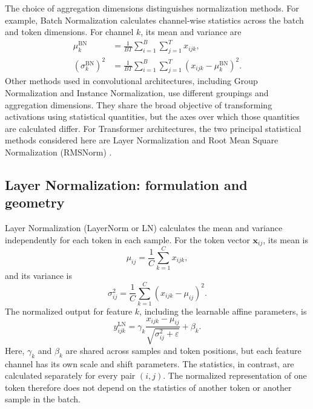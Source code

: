 The choice of aggregation dimensions distinguishes normalization methods.
For example, Batch Normalization calculates channel-wise statistics across
the batch and token dimensions. For channel \(k\), its mean and variance
are
\begin{align}
    \mu_k^{\mathrm{BN}}
    &=
    \frac{1}{BT}
    \sum_{i=1}^{B}\sum_{j=1}^{T}x_{ijk},
    \label{eq:norm-bn-mean}
    \\
    (\sigma_k^{\mathrm{BN}})^2
    &=
    \frac{1}{BT}
    \sum_{i=1}^{B}\sum_{j=1}^{T}
    (x_{ijk}-\mu_k^{\mathrm{BN}})^2.
    \label{eq:norm-bn-variance}
\end{align}
Other methods used in convolutional architectures, including Group
Normalization and Instance Normalization, use different groupings and
aggregation dimensions. They share the broad objective of transforming
activations using statistical quantities, but the axes over which those
quantities are calculated differ. For Transformer architectures, the two
principal statistical methods considered here are Layer Normalization and
Root Mean Square Normalization (RMSNorm)
\parencite{zhu2025dyt,corradini2025slmreview}.

\subsection{Layer Normalization: formulation and geometry}
\label{subsec:norm-layernorm}

Layer Normalization (LayerNorm or LN) calculates the mean and variance
independently for each token in each sample. For the token vector
\(\mathbf{x}_{ij}\), its mean is
\begin{equation}
    \mu_{ij}
    =
    \frac{1}{C}\sum_{k=1}^{C}x_{ijk},
    \label{eq:norm-ln-mean}
\end{equation}
and its variance is
\begin{equation}
    \sigma_{ij}^{2}
    =
    \frac{1}{C}\sum_{k=1}^{C}
    (x_{ijk}-\mu_{ij})^2.
    \label{eq:norm-ln-variance}
\end{equation}
The normalized output for feature \(k\), including the learnable affine
parameters, is
\begin{equation}
    \boxed{
    y_{ijk}^{\mathrm{LN}}
    =
    \gamma_k
    \frac{x_{ijk}-\mu_{ij}}
    {\sqrt{\sigma_{ij}^{2}+\varepsilon}}
    +\beta_k.
    }
    \label{eq:norm-layernorm}
\end{equation}
Here, \(\gamma_k\) and \(\beta_k\) are shared across samples and token
positions, but each feature channel has its own scale and shift parameters.
The statistics, in contrast, are calculated separately for every pair
\((i,j)\). The normalized representation of one token therefore does not
depend on the statistics of another token or another sample in the batch.

